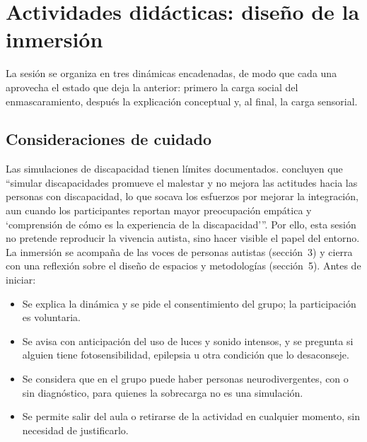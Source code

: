 
\section{Actividades didácticas: diseño de la inmersión}

La sesión se organiza en tres dinámicas encadenadas, de modo que cada una aprovecha el estado que deja la anterior: primero la carga social del enmascaramiento, después la explicación conceptual y, al final, la carga sensorial.

\subsection{Consideraciones de cuidado}

Las simulaciones de discapacidad tienen límites documentados. \citet[p.~324]{nario2017} concluyen que \enquote{simular discapacidades promueve el malestar y no mejora las actitudes hacia las personas con discapacidad, lo que socava los esfuerzos por mejorar la integración, aun cuando los participantes reportan mayor preocupación empática y \enquote{comprensión de cómo es la experiencia de la discapacidad}}.
Por ello, esta sesión no pretende reproducir la vivencia autista, sino hacer visible el papel del entorno. La inmersión se acompaña de las voces de personas autistas (sección~3) y cierra con una reflexión sobre el diseño de espacios y metodologías (sección~5). Antes de iniciar:

\begin{itemize}
  \item Se explica la dinámica y se pide el consentimiento del grupo; la participación es voluntaria.
  \item Se avisa con anticipación del uso de luces y sonido intensos, y se pregunta si alguien tiene fotosensibilidad, epilepsia u otra condición que lo desaconseje.
  \item Se considera que en el grupo puede haber personas neurodivergentes, con o sin diagnóstico, para quienes la sobrecarga no es una simulación.
  \item Se permite salir del aula o retirarse de la actividad en cualquier momento, sin necesidad de justificarlo.
\end{itemize}


